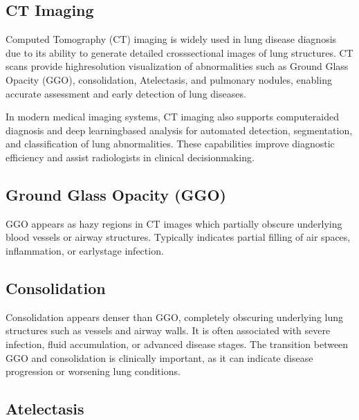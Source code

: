 \subsection{CT Imaging}

Computed Tomography (CT) imaging is widely used in lung disease diagnosis due to its ability to generate detailed crosssectional images of lung structures. \cite{sluimer2006ct} %
CT scans provide highresolution visualization of abnormalities such as Ground Glass Opacity (GGO), consolidation, Atelectasis, and pulmonary nodules, enabling accurate assessment and early detection of lung diseases. \cite{hansell2008fleischner} %

In modern medical imaging systems, CT imaging also supports computeraided diagnosis and deep learningbased analysis for automated detection, segmentation, and classification of lung abnormalities. \cite{litjens2017survey} %
These capabilities improve diagnostic efficiency and assist radiologists in clinical decisionmaking.

\subsection{Ground Glass Opacity (GGO)}

GGO appears as hazy regions in CT images which partially obscure underlying blood vessels or airway structures.
Typically indicates partial filling of air spaces, inflammation, or earlystage infection. \cite{park2011ggo}
\subsection{Consolidation}

Consolidation appears denser than GGO, completely obscuring underlying lung structures such as vessels and airway walls. \cite{hansell2008fleischner}
It is often associated with severe infection, fluid accumulation, or advanced disease stages.
The transition between GGO and consolidation is clinically important, as it can indicate disease progression or worsening lung conditions. \cite{chung2021covid}

\subsection{Atelectasis}

